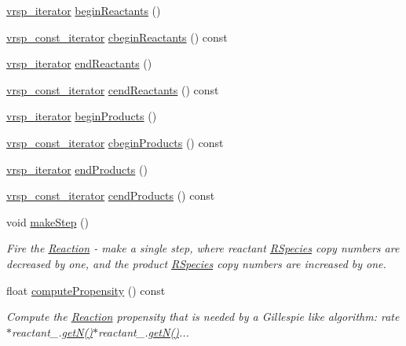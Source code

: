 \begin{DoxyCompactItemize}
\hyperlink{namespacechem_a9b02b32d43473a3cd87fd30f910cc121}{vrsp\-\_\-iterator} \hyperlink{classchem_1_1Reaction_a7637b6f060d8d1ca859d89966ccfd39e}{begin\-Reactants} ()
\item 
\hyperlink{namespacechem_ab6ba36c9953625b15ff4105e1cdfdb86}{vrsp\-\_\-const\-\_\-iterator} \hyperlink{classchem_1_1Reaction_a84a70eef65b79375f92a0b702883da54}{cbegin\-Reactants} () const 
\item 
\hyperlink{namespacechem_a9b02b32d43473a3cd87fd30f910cc121}{vrsp\-\_\-iterator} \hyperlink{classchem_1_1Reaction_a14336488f8477a51295ae8a6e68aacda}{end\-Reactants} ()
\item 
\hyperlink{namespacechem_ab6ba36c9953625b15ff4105e1cdfdb86}{vrsp\-\_\-const\-\_\-iterator} \hyperlink{classchem_1_1Reaction_a0df8820ef13d8ba3014b610b1aeeed9e}{cend\-Reactants} () const 
\item 
\hyperlink{namespacechem_a9b02b32d43473a3cd87fd30f910cc121}{vrsp\-\_\-iterator} \hyperlink{classchem_1_1Reaction_abd8e1fd6c8f8d247896fc15ebdd02dbc}{begin\-Products} ()
\item 
\hyperlink{namespacechem_ab6ba36c9953625b15ff4105e1cdfdb86}{vrsp\-\_\-const\-\_\-iterator} \hyperlink{classchem_1_1Reaction_a369a58328dc07d471ab884924872ba4d}{cbegin\-Products} () const 
\item 
\hyperlink{namespacechem_a9b02b32d43473a3cd87fd30f910cc121}{vrsp\-\_\-iterator} \hyperlink{classchem_1_1Reaction_a3d432b1719243cf0bb3259071c488afd}{end\-Products} ()
\item 
\hyperlink{namespacechem_ab6ba36c9953625b15ff4105e1cdfdb86}{vrsp\-\_\-const\-\_\-iterator} \hyperlink{classchem_1_1Reaction_a666cd5d81c28e29af77cabcbd3846540}{cend\-Products} () const 
\item 
void \hyperlink{classchem_1_1Reaction_a1341d466157788c3d547da52c6c59502}{make\-Step} ()
\begin{DoxyCompactList}\small\item\em Fire the \hyperlink{classchem_1_1Reaction}{Reaction} -\/ make a single step, where reactant \hyperlink{classchem_1_1RSpecies}{R\-Species} copy numbers are decreased by one, and the product \hyperlink{classchem_1_1RSpecies}{R\-Species} copy numbers are increased by one. \end{DoxyCompactList}\item 
float \hyperlink{classchem_1_1Reaction_a676eec8b5b28c191c555a944a2c03857}{compute\-Propensity} () const 
\begin{DoxyCompactList}\small\item\em Compute the \hyperlink{classchem_1_1Reaction}{Reaction} propensity that is needed by a Gillespie like algorithm\-: rate$\ast$reactant\-\_.\hyperlink{classchem_1_1Reaction_a35c63f46973b5cda157661ab9bffb682}{get\-N()}$\ast$reactant\-\_.\hyperlink{classchem_1_1Reaction_a35c63f46973b5cda157661ab9bffb682}{get\-N()}... \end{DoxyCompactList}\item 

\end{DoxyCompactItemize}
